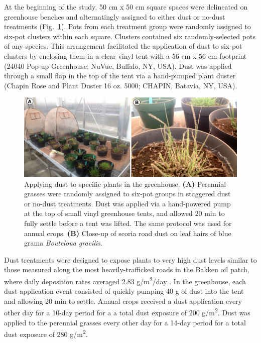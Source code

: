 \documentclass{svjour3}
\begin{document}
At the beginning of the study, 50 cm x 50 cm square spaces were delineated on greenhouse benches and alternatingly assigned to either dust or no-dust treatments (Fig.~\ref{pic:dusting}). 
Pots from each treatment group were randomly assigned to six-pot clusters within each square. 
Clusters contained six randomly-selected pots of any species. 
This arrangement facilitated the application of dust to six-pot clusters by enclosing them in a clear vinyl tent with a 56 cm x 56 cm footprint (24040 Pop-up Greenhouse; NuVue, Buffalo, NY, USA). 
Dust was applied through a small flap in the top of the tent via a hand-pumped plant duster (Chapin Rose and Plant Duster 16 oz. 5000; CHAPIN, Batavia, NY, USA). 

\begin{figure}
  \includegraphics[width=\linewidth]{figures/GreenhouseDust}
  \caption{Applying dust to specific plants in the greenhouse. 
  \textbf{(A)} Perennial grasses were randomly assigned to six-pot groups in staggered dust or no-dust treatments. 
  Dust was applied via a hand-powered pump at the top of small vinyl greenhouse tents, and allowed 20 min to fully settle before a tent was lifted. 
  The same protocol was used for annual crops. 
  \textbf{(B)} Close-up of scoria road dust on leaf hairs of blue grama \emph{Bouteloua gracilis}. 
  \label{pic:dusting}}
\end{figure}

Dust treatments were designed to expose plants to very high dust levels similar to those measured along the most heavily-trafficked roads in the Bakken oil patch, where daily deposition rates averaged 2.83 g/m\textsuperscript{2}/day \citep{spiess2020}. 
In the greenhouse, each dust application event consisted of quickly pumping 40 g of dust into the tent and allowing 20 min to settle.
Annual crops received a dust application every other day for a 10-day period for a  a total dust exposure of 200 g/m\textsuperscript{2}.
Dust was applied to the perennial grasses every other day for a 14-day period for a total dust exposure of 280 g/m\textsuperscript{2}.
\end{document}
